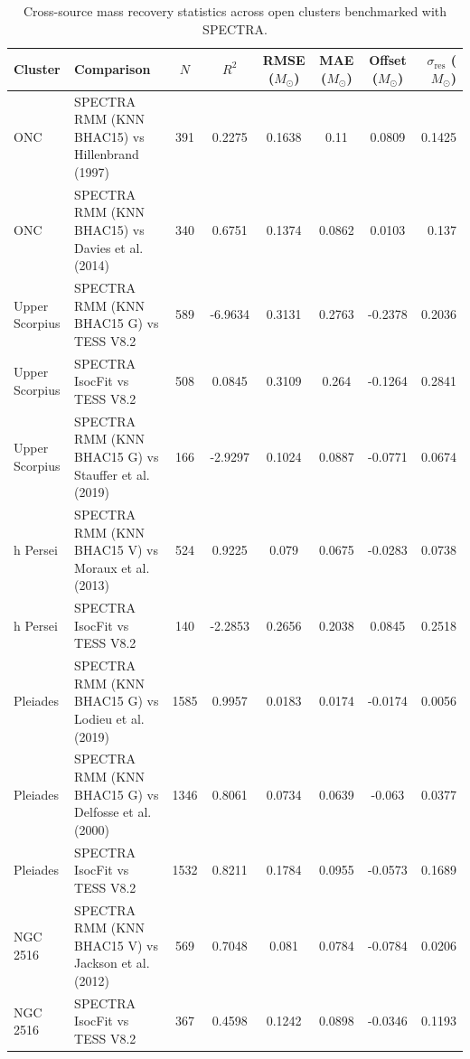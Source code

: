\begin{table}
\centering
\caption{Cross-source mass recovery statistics across open clusters benchmarked with \textsc{SPECTRA}.}
\label{tab:cross_source_comparison}
\begin{tabular}{llcccccr}
\hline
Cluster & Comparison & $N$ & $R^2$ & RMSE ($M_\odot$) & MAE ($M_\odot$) & Offset ($M_\odot$) & $\sigma_{\text{res}}$ ($M_\odot$) \\
\hline
ONC & SPECTRA RMM (KNN BHAC15) vs Hillenbrand (1997) & 391 & 0.2275 & 0.1638 & 0.11 & 0.0809 & 0.1425 \\
ONC & SPECTRA RMM (KNN BHAC15) vs Davies et al. (2014) & 340 & 0.6751 & 0.1374 & 0.0862 & 0.0103 & 0.137 \\
Upper Scorpius & SPECTRA RMM (KNN BHAC15 G) vs TESS V8.2 & 589 & -6.9634 & 0.3131 & 0.2763 & -0.2378 & 0.2036 \\
Upper Scorpius & SPECTRA IsocFit vs TESS V8.2 & 508 & 0.0845 & 0.3109 & 0.264 & -0.1264 & 0.2841 \\
Upper Scorpius & SPECTRA RMM (KNN BHAC15 G) vs Stauffer et al. (2019) & 166 & -2.9297 & 0.1024 & 0.0887 & -0.0771 & 0.0674 \\
h Persei & SPECTRA RMM (KNN BHAC15 V) vs Moraux et al. (2013) & 524 & 0.9225 & 0.079 & 0.0675 & -0.0283 & 0.0738 \\
h Persei & SPECTRA IsocFit vs TESS V8.2 & 140 & -2.2853 & 0.2656 & 0.2038 & 0.0845 & 0.2518 \\
Pleiades & SPECTRA RMM (KNN BHAC15 G) vs Lodieu et al. (2019) & 1585 & 0.9957 & 0.0183 & 0.0174 & -0.0174 & 0.0056 \\
Pleiades & SPECTRA RMM (KNN BHAC15 G) vs Delfosse et al. (2000) & 1346 & 0.8061 & 0.0734 & 0.0639 & -0.063 & 0.0377 \\
Pleiades & SPECTRA IsocFit vs TESS V8.2 & 1532 & 0.8211 & 0.1784 & 0.0955 & -0.0573 & 0.1689 \\
NGC 2516 & SPECTRA RMM (KNN BHAC15 V) vs Jackson et al. (2012) & 569 & 0.7048 & 0.081 & 0.0784 & -0.0784 & 0.0206 \\
NGC 2516 & SPECTRA IsocFit vs TESS V8.2 & 367 & 0.4598 & 0.1242 & 0.0898 & -0.0346 & 0.1193 \\
\hline
\end{tabular}
\end{table}